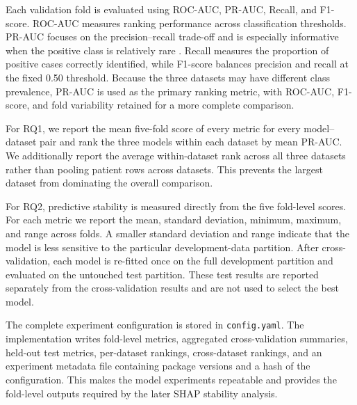 Each validation fold is evaluated using ROC-AUC, PR-AUC, Recall, and F1-score.
ROC-AUC measures ranking performance across classification thresholds. PR-AUC
focuses on the precision--recall trade-off and is especially informative when
the positive class is relatively rare \cite{saito2015precisionrecall}. Recall
measures the proportion of positive cases correctly identified, while F1-score
balances precision and recall at the fixed 0.50 threshold. Because the three
datasets may have different class prevalence, PR-AUC is used as the primary
ranking metric, with ROC-AUC, F1-score, and fold variability retained for a more
complete comparison.

For RQ1, we report the mean five-fold score of every metric for every
model--dataset pair and rank the three models within each dataset by mean
PR-AUC. We additionally report the average within-dataset rank across all three
datasets rather than pooling patient rows across datasets. This prevents the
largest dataset from dominating the overall comparison.

For RQ2, predictive stability is measured directly from the five fold-level
scores. For each metric we report the mean, standard deviation, minimum,
maximum, and range across folds. A smaller standard deviation and range indicate
that the model is less sensitive to the particular development-data partition.
After cross-validation, each model is re-fitted once on the full development
partition and evaluated on the untouched test partition. These test results are
reported separately from the cross-validation results and are not used to
select the best model.

The complete experiment configuration is stored in \texttt{config.yaml}. The
implementation writes fold-level metrics, aggregated cross-validation summaries,
held-out test metrics, per-dataset rankings, cross-dataset rankings, and an
experiment metadata file containing package versions and a hash of the
configuration. This makes the model experiments repeatable and provides the
fold-level outputs required by the later SHAP stability analysis.
